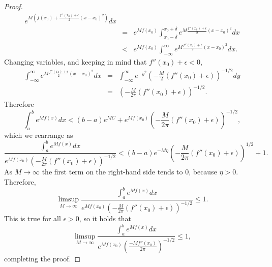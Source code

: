 \documentclass{article}
\theoremstyle{definition}
\begin{document}
\begin{proof}
\begin{eqnarray*}
e^{M\left(f(x_0) + \frac{f''(x_0)+\epsilon}{2}(x-x_0)^2\right)} dx\\
&=&e^{Mf(x_0)} \int_{x_0-\delta}^{x_0+\delta} e^{M\frac{f''(x_0)+\epsilon}{2}(x-x_0)^2} dx\\
&<&e^{Mf(x_0)} \int_{-\infty}^{\infty} e^{M\frac{f''(x_0)+\epsilon}{2}(x-x_0)^2} dx.
\end{eqnarray*}
Changing variables, and keeping in mind that $f''(x_0)+\epsilon<0$,
\begin{eqnarray*}
 \int_{-\infty}^{\infty} e^{M\frac{f''(x_0)+\epsilon}{2}(x-x_0)^2} dx&=&
 \int_{-\infty}^\infty e^{-y^2} \left(-\frac{M}{2}(f''(x_0)+\epsilon)\right)^{-1/2} dy\\
 &=& \left(-\frac{M}{2\pi}(f''(x_0)+\epsilon)\right)^{-1/2}.
\end{eqnarray*}
Therefore 
\[
\int_a^b e^{Mf(x)} dx < (b-a) e^{MC}  + e^{Mf(x_0)} \left(-\frac{M}{2\pi}(f''(x_0)+\epsilon)\right)^{-1/2},
\]
which we rearrange as
\[
\frac{\int_a^b e^{Mf(x)} dx}{e^{Mf(x_0)}  \left(-\frac{M}{2\pi}(f''(x_0)+\epsilon)\right)^{-1/2}}
< (b-a) e^{-M\eta}  \left(-\frac{M}{2\pi}(f''(x_0)+\epsilon)\right)^{1/2}
+1.
\]
As $M \to \infty$ the first term on the right-hand side tends to $0$, because $\eta>0$. Therefore,
\[
\limsup_{M \to \infty} \frac{\int_a^b e^{Mf(x)} dx}{e^{Mf(x_0)}  \left(-\frac{M}{2\pi}(f''(x_0)+\epsilon)\right)^{-1/2}} \leq 1.
\]
This is true for all $\epsilon>0$, so it holds that
\[
\limsup_{M \to \infty} \frac{\int_a^b e^{Mf(x)} dx}{e^{Mf(x_0)}  \left(\frac{-Mf''(x_0)}{2\pi} \right)^{-1/2}} \leq 1,
\]
completing the proof.
\end{proof}
\end{document}
